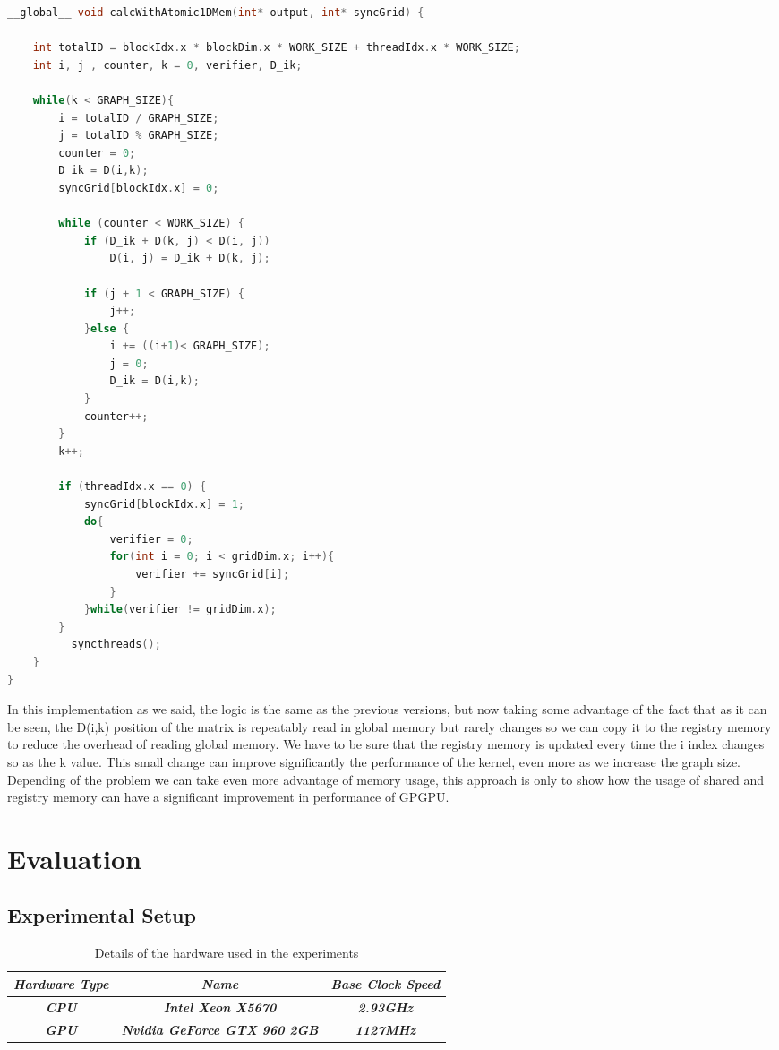 \documentclass[conference]{IEEEtran}
\begin{document}
\begin{lstlisting}[language=C++, caption=CUDA implementation with memory improvements]
__global__ void calcWithAtomic1DMem(int* output, int* syncGrid) {

	int totalID = blockIdx.x * blockDim.x * WORK_SIZE + threadIdx.x * WORK_SIZE;
	int i, j , counter, k = 0, verifier, D_ik;

	while(k < GRAPH_SIZE){
		i = totalID / GRAPH_SIZE;
		j = totalID % GRAPH_SIZE;
		counter = 0;
		D_ik = D(i,k);
		syncGrid[blockIdx.x] = 0;
		
		while (counter < WORK_SIZE)	{
			if (D_ik + D(k, j) < D(i, j))
				D(i, j) = D_ik + D(k, j);
				
			if (j + 1 < GRAPH_SIZE) {
				j++;
			}else {
				i += ((i+1)< GRAPH_SIZE);
				j = 0;
				D_ik = D(i,k);
			}
			counter++;
		}
		k++;

		if (threadIdx.x == 0) {
			syncGrid[blockIdx.x] = 1;
			do{
				verifier = 0;
				for(int i = 0; i < gridDim.x; i++){
					verifier += syncGrid[i];
				}
			}while(verifier != gridDim.x);		
		}
		__syncthreads();
	}
}
\end{lstlisting}

In this implementation as we said, the logic is the same as the previous versions, but now taking some advantage of the fact that as it can be seen, the D(i,k) position of the matrix is repeatably read in global memory but rarely changes so we can copy it to the registry memory to reduce the overhead of reading global memory. We have to be sure that the registry memory is updated every time the i index changes so as the k value. This small change can improve significantly the performance of the kernel, even more as we increase the graph size. Depending of the problem we can take even more advantage of memory usage, this approach is only to show how the usage of shared and registry memory can have a significant improvement in performance of GPGPU.

\section{Evaluation}

\subsection{Experimental Setup}

\begin{table}[htbp]
	\caption{Details of the hardware used in the experiments}
	\begin{center}
		\begin{tabular}{|c|c|c|}
		\hline
			\textbf{\textit{Hardware Type}} & \textbf{\textit{Name}} & \textbf{\textit{Base Clock Speed}}\\ \hline
			\textbf{\textit{CPU}} & \textbf{\textit{Intel Xeon X5670}} & \textbf{\textit{2.93GHz}} \\ \hline
			\textbf{\textit{GPU}} & \textbf{\textit{Nvidia GeForce GTX 960 2GB}} & \textbf{\textit{1127MHz}} \\ \hline
	\end{tabular}
	\label{tab1}
	\end{center}
\end{table}
\end{document}
